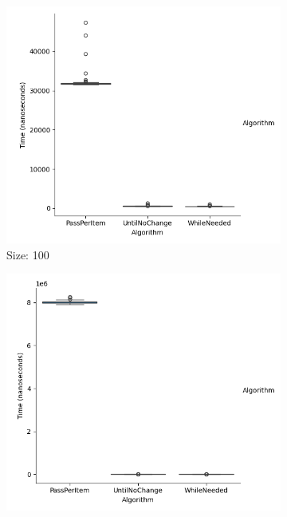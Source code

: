 \documentclass{article}
\begin{document}
\begin{figure}[ht]
  \centering
  \begin{subfigure}{0.3\textwidth}
    \centering
    \includegraphics[width=\linewidth]{../figureIntAsc100.png}
    \caption{Size: 100}
    \label{fig:img1}
  \end{subfigure}
  \begin{subfigure}{0.3\textwidth}
    \centering
    \includegraphics[width=\linewidth]{../figureIntAsc1000.png}

\end{subfigure}
\end{figure}
\end{document}

